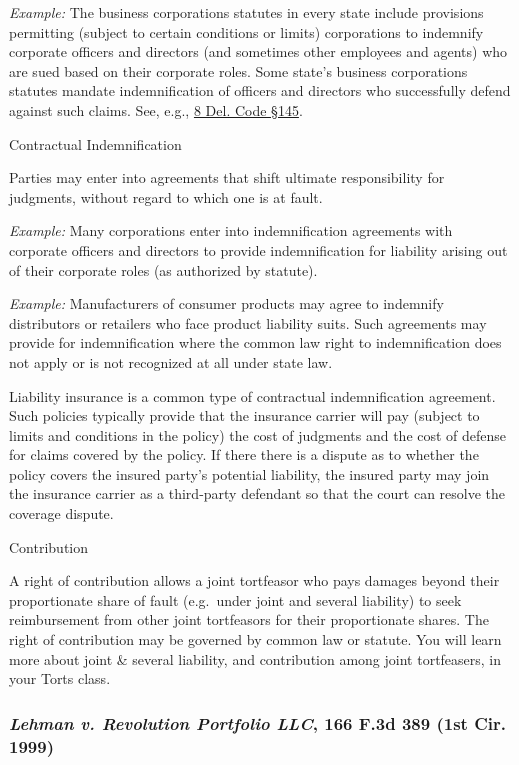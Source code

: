 \documentclass[11pt,letterpaper,twoside]{article}
\begin{document}
\emph{Example:} The business corporations statutes in every state
include provisions permitting (subject to certain conditions or limits)
corporations to indemnify corporate officers and directors (and
sometimes other employees and agents) who are sued based on their
corporate roles. Some state's business corporations statutes mandate
indemnification of officers and directors who successfully defend
against such claims. See, e.g.,
\href{https://delcode.delaware.gov/title8/c001/sc04/}{8 Del. Code §145}.

{Contractual Indemnification}

Parties may enter into agreements that shift ultimate responsibility for
judgments, without regard to which one is at fault.

\emph{Example:} Many corporations enter into indemnification agreements
with corporate officers and directors to provide indemnification for
liability arising out of their corporate roles (as authorized by
statute).

\emph{Example:} Manufacturers of consumer products may agree to
indemnify distributors or retailers who face product liability suits.
Such agreements may provide for indemnification where the common law
right to indemnification does not apply or is not recognized at all
under state law.

Liability insurance is a common type of contractual indemnification
agreement. Such policies typically provide that the insurance carrier
will pay (subject to limits and conditions in the policy) the cost of
judgments and the cost of defense for claims covered by the policy. If
there there is a dispute as to whether the policy covers the insured
party's potential liability, the insured party may join the insurance
carrier as a third-party defendant so that the court can resolve the
coverage dispute.

{Contribution}

A right of contribution allows a joint tortfeasor who pays damages
beyond their proportionate share of fault (e.g.~under joint and several
liability) to seek reimbursement from other joint tortfeasors for their
proportionate shares. The right of contribution may be governed by
common law or statute. You will learn more about joint \& several
liability, and contribution among joint tortfeasers, in your Torts
class.

\subsubsection{\texorpdfstring{\emph{Lehman v. Revolution Portfolio
LLC}, 166 F.3d 389 (1st Cir.
1999)}{Lehman v. Revolution Portfolio LLC, 166 F.3d 389 (1st Cir. 1999)}}\label{lehmanrevolutionportfoliollc_1stcir1999}
\end{document}
